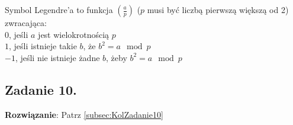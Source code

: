 \documentclass[a4paper,10pt, twocolumn]{article}
\begin{document}
Symbol Legendre'a to funkcja $\left( \frac a p \right)$ ($p$ musi być liczbą pierwszą większą od 2) zwracająca:
\\$0$, jeśli $a$ jest wielokrotnością $p$
\\$1$, jeśli istnieje takie $b$, że $b^2=a \mod p$
\\$-1$, jeśli nie istnieje żadne $b$, żeby $b^2=a \mod p$

\subsection{Zadanie 10.}
\textbf{Rozwiązanie}: Patrz \ref{subsec:KolZadanie10}
\end{document}
